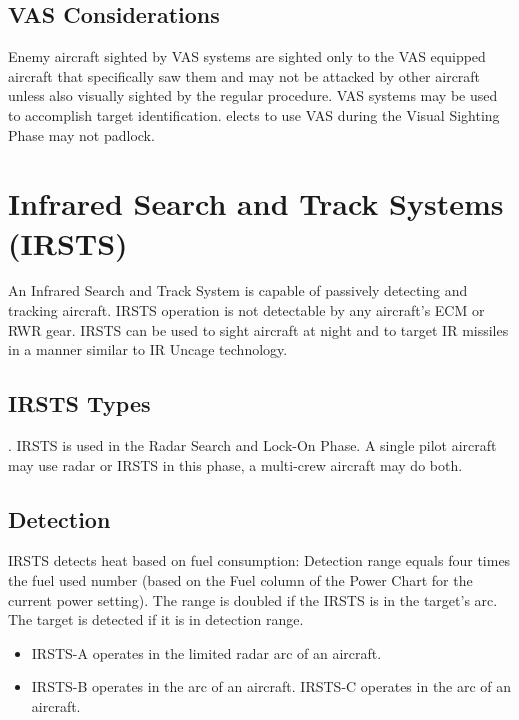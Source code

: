 \begin{advancedrules}
    \subsection{VAS Considerations} Enemy aircraft sighted by VAS systems are sighted only to the VAS equipped aircraft that specifically saw them and may not be attacked by other aircraft unless also visually sighted by the regular procedure. VAS systems may be used to accomplish target identification.  elects to use VAS during the Visual Sighting Phase may not padlock.

    \section{Infrared Search and Track Systems (IRSTS)}
    \label{rule:irsts}

    An Infrared Search and Track System is capable of passively detecting and tracking aircraft. IRSTS operation is not detectable by any aircraft's ECM or RWR gear. IRSTS can be used to sight aircraft at night and to target IR missiles in a manner similar to IR Uncage technology.

    \subsection{IRSTS Types} . IRSTS is used in the Radar Search and Lock-On Phase. A single pilot aircraft may use radar or IRSTS in this phase, a multi-crew aircraft may do both. 

    \subsection{Detection} IRSTS detects heat based on fuel consumption: Detection range equals four times the fuel used number (based on the Fuel column of the Power Chart for the current power setting). The range is doubled if the IRSTS is in the target's  arc. The target is detected if it is in detection range.

    \begin{itemize}
        \item IRSTS-A operates in the limited radar arc of an aircraft.
        \item IRSTS-B operates in the  arc of an aircraft.
             IRSTS-C operates in the  arc of an aircraft.
    \end{itemize}


\end{advancedrules}
